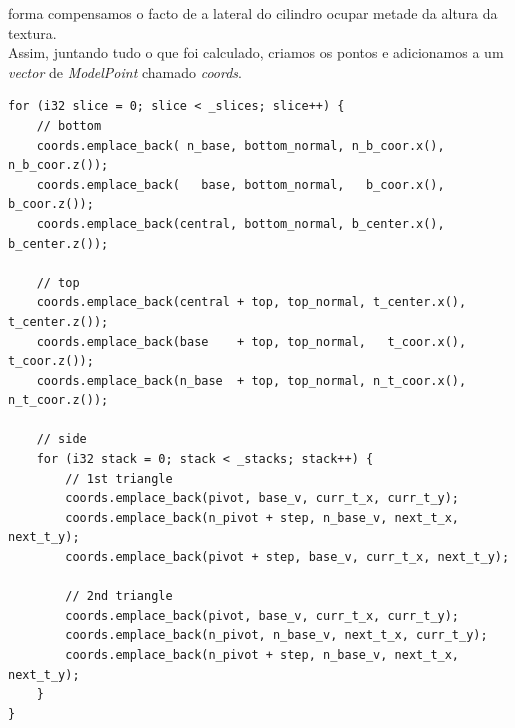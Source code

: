 \documentclass[a4paper]{report}
\begin{document}
forma compensamos o facto de a lateral do cilindro ocupar metade da altura da
textura.\\
Assim, juntando tudo o que foi calculado, criamos os pontos e adicionamos a um
\textit{vector} de \textit{ModelPoint} chamado \textit{coords}.
\begin{lstlisting}
for (i32 slice = 0; slice < _slices; slice++) {
    // bottom
    coords.emplace_back( n_base, bottom_normal, n_b_coor.x(), n_b_coor.z());
    coords.emplace_back(   base, bottom_normal,   b_coor.x(),   b_coor.z());
    coords.emplace_back(central, bottom_normal, b_center.x(), b_center.z());

    // top
    coords.emplace_back(central + top, top_normal, t_center.x(), t_center.z());
    coords.emplace_back(base    + top, top_normal,   t_coor.x(),   t_coor.z());
    coords.emplace_back(n_base  + top, top_normal, n_t_coor.x(), n_t_coor.z());

    // side
    for (i32 stack = 0; stack < _stacks; stack++) {
        // 1st triangle
        coords.emplace_back(pivot, base_v, curr_t_x, curr_t_y);
        coords.emplace_back(n_pivot + step, n_base_v, next_t_x, next_t_y);
        coords.emplace_back(pivot + step, base_v, curr_t_x, next_t_y);

        // 2nd triangle
        coords.emplace_back(pivot, base_v, curr_t_x, curr_t_y);
        coords.emplace_back(n_pivot, n_base_v, next_t_x, curr_t_y);
        coords.emplace_back(n_pivot + step, n_base_v, next_t_x, next_t_y);
    }
}
\end{lstlisting}
\end{document}
